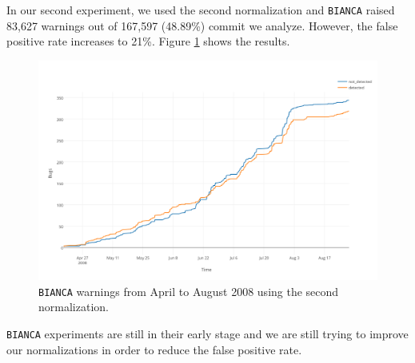 In our second experiment, we used the second normalization and {\tt BIANCA} raised 83,627 warnings out of 167,597 (48.89\%) commit we analyze. However, the false positive rate increases to 21\%. Figure \ref{fig:bianca-exp-2} shows the results.

\begin{figure}[h!]
  \centering
    \includegraphics[scale=0.55]{media/bianca-20.png}
    \caption{{\tt BIANCA} warnings from April to August 2008 using the second normalization.
    \label{fig:bianca-exp-2}}
\end{figure}

{\tt BIANCA} experiments are still in their early stage and we are still trying to improve our normalizations in order to reduce the false positive rate.
